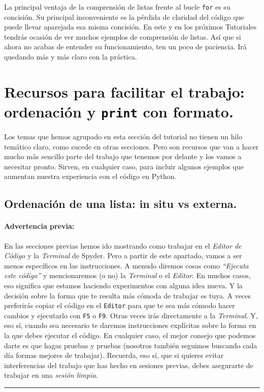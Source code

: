 \documentclass[10pt,a4paper]{article}\usepackage[]{graphicx}\usepackage[]{color}
\begin{document}
La principal ventaja de la comprensión de listas frente al bucle {\tt for} es su concisión. Su principal inconveniente es la pérdida de claridad del código que puede llevar aparejada esa misma concisión. En este y en los próximos Tutoriales tendrás ocasión de ver muchos ejemplos de comprensión de listas. Así que si ahora no acabas de entender su funcionamiento, ten un poco de paciencia. Irá quedando más y más claro con la práctica. 


\section{Recursos para facilitar el trabajo: ordenación y {\tt print} con formato.}
\label{tut02:sec:recursosOrdenacionPrint}

Los temas que hemos agrupado en esta sección del tutorial no tienen un hilo temático claro, como sucede en otras secciones. Pero son recursos que van a hacer mucho más sencillo parte del trabajo que tenemos por delante y los vamos a necesitar pronto. Sirven, en cualquier caso, para incluir algunos ejemplos que aumentan nuestra experiencia con el código en Python. 

\subsection{Ordenación de una lista: in situ vs externa.}
\label{tut02:subsubsec:ordenacionLista}

\paragraph{Advertencia previa:} En las secciones previas hemos ido mostrando como trabajar en el {\em Editor de Código} y la {\em Terminal} de Spyder. Pero a partir de este apartado, vamos a ser menos específicos en las instrucciones. A menudo diremos cosas como {\em ``Ejecuta este código''} y mencionaremos (o no) la {\em Terminal} o el {\em Editor}. En muchos casos, eso significa que estamos haciendo experimentos con alguna idea nueva. Y la decisión sobre la forma que te resulta más cómoda de trabajar es tuya. A veces preferirás copiar el código en el {\tt Editor} para que te sea más cómodo hacer cambios y ejecutarlo con {\tt F5} o {\tt F9}. Otras veces irás directamente a la {\em Terminal}. Y, eso sí, cuando sea necesario te daremos instrucciones explícitas sobre la forma en la que debes ejecutar el código. En cualquier caso, el mejor consejo que podemos darte es que hagas pruebas y pruebas (nosotros también seguimos buscando cada día formas mejores de trabajar). Recuerda, eso sí, que si quieres evitar interferencias del trabajo que has hecho en sesiones previas, debes asegurarte de trabajar en una {\em sesión limpia}.
\hrule
\quad\\
\end{document}
